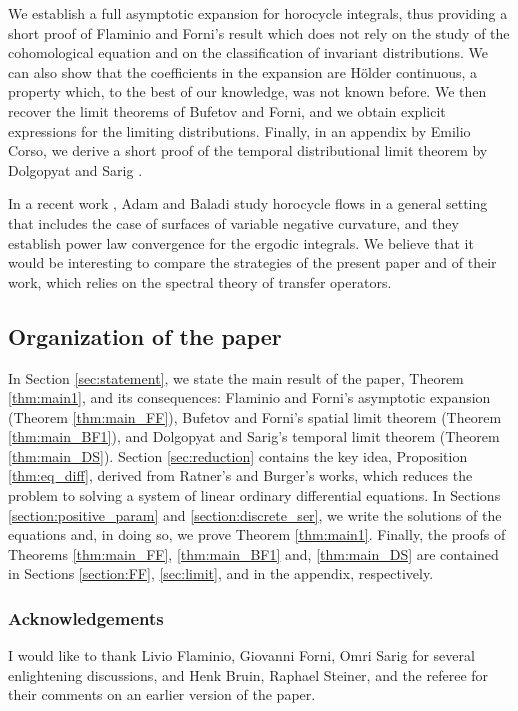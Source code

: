 We establish a full asymptotic expansion for horocycle integrals, thus providing a short proof of Flaminio and Forni's result which does not rely on the study of the cohomological equation and on the classification of invariant distributions.
We can also show that the coefficients in the expansion are Hölder continuous, a property which, to the best of our knowledge, was not known before.
We then recover the limit theorems of Bufetov and Forni, and we obtain explicit expressions for the limiting distributions.
Finally, in an appendix by Emilio Corso, we derive a short proof of the temporal distributional limit theorem by Dolgopyat and Sarig \cite{Dolgopyat-Sarig}.

In a recent work \cite{AdBa}, Adam and Baladi study horocycle flows in a general setting that includes the case of surfaces of variable negative curvature, and they establish power law convergence for the ergodic integrals. We believe that it would be interesting to compare the strategies of the present paper and of their work, which relies on the spectral theory of transfer operators.

\subsection{Organization of the paper}

In Section \ref{sec:statement}, we state the main result of the paper, Theorem \ref{thm:main1}, and its consequences: Flaminio and Forni's asymptotic expansion (Theorem \ref{thm:main_FF}), Bufetov and Forni's spatial limit theorem (Theorem \ref{thm:main_BF1}), and Dolgopyat and Sarig's temporal limit theorem (Theorem \ref{thm:main_DS}).
Section \ref{sec:reduction} contains the key idea, Proposition \ref{thm:eq_diff}, derived from Ratner's and Burger's works, which reduces the problem to solving a system of linear ordinary differential equations. In Sections \ref{section:positive_param} and \ref{section:discrete_ser}, we write the solutions of the equations and, in doing so, we prove Theorem \ref{thm:main1}. Finally, the proofs of Theorems \ref{thm:main_FF}, \ref{thm:main_BF1} and, \ref{thm:main_DS} are contained in Sections \ref{section:FF}, \ref{sec:limit}, and in the appendix, respectively.

\subsubsection*{Acknowledgements}
I would like to thank Livio Flaminio, Giovanni Forni, Omri Sarig for several enlightening discussions, and Henk Bruin, Raphael Steiner, and the referee for their comments on an earlier version of the paper.

